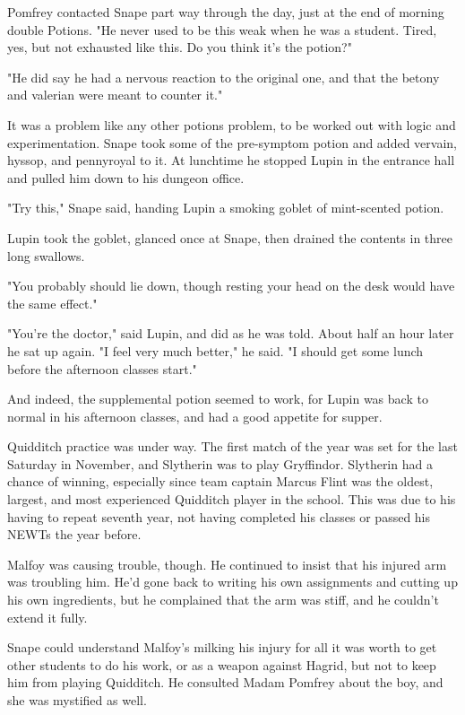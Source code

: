 Pomfrey contacted Snape part way through the day, just at the end of morning double Potions. "He never used to be this weak when he was a student. Tired, yes, but not exhausted like this. Do you think it's the potion?"

"He did say he had a nervous reaction to the original one, and that the betony and valerian were meant to counter it."

It was a problem like any other potions problem, to be worked out with logic and experimentation. Snape took some of the pre-symptom potion and added vervain, hyssop, and pennyroyal to it. At lunchtime he stopped Lupin in the entrance hall and pulled him down to his dungeon office.

"Try this," Snape said, handing Lupin a smoking goblet of mint-scented potion.

Lupin took the goblet, glanced once at Snape, then drained the contents in three long swallows.

"You probably should lie down, though resting your head on the desk would have the same effect."

"You're the doctor," said Lupin, and did as he was told. About half an hour later he sat up again. "I feel very much better," he said. "I should get some lunch before the afternoon classes start."

And indeed, the supplemental potion seemed to work, for Lupin was back to normal in his afternoon classes, and had a good appetite for supper.

\sbreak

Quidditch practice was under way. The first match of the year was set for the last Saturday in November, and Slytherin was to play Gryffindor. Slytherin had a chance of winning, especially since team captain Marcus Flint was the oldest, largest, and most experienced Quidditch player in the school. This was due to his having to repeat seventh year, not having completed his classes or passed his NEWTs the year before.

Malfoy was causing trouble, though. He continued to insist that his injured arm was troubling him. He'd gone back to writing his own assignments and cutting up his own ingredients, but he complained that the arm was stiff, and he couldn't extend it fully.

Snape could understand Malfoy's milking his injury for all it was worth to get other students to do his work, or as a weapon against Hagrid, but not to keep him from playing Quidditch. He consulted Madam Pomfrey about the boy, and she was mystified as well.

